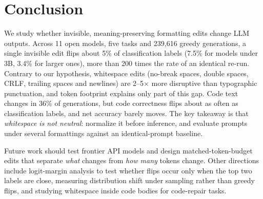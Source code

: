 \section{Conclusion}
\label{sec:conclusion}

We study whether invisible, meaning-preserving formatting edits change LLM outputs.
Across 11 open models, five tasks and 239,616 greedy generations, a single invisible edit flips about 5\% of classification labels (7.5\% for models under 3B, 3.4\% for larger ones), more than 200 times the rate of an identical re-run.
Contrary to our hypothesis, whitespace edits (no-break spaces, double spaces, CRLF, trailing spaces and newlines) are 2--5$\times$ more disruptive than typographic punctuation, and token footprint explains only part of this gap.
Code text changes in 36\% of generations, but code correctness flips about as often as classification labels, and net accuracy barely moves.
The key takeaway is that \emph{whitespace is not neutral}: normalize it before inference, and evaluate prompts under several formattings against an identical-prompt baseline.

Future work should test frontier API models and design matched-token-budget edits that separate \emph{what} changes from \emph{how many} tokens change.
Other directions include logit-margin analysis to test whether flips occur only when the top two labels are close, measuring distribution shift under sampling rather than greedy flips, and studying whitespace inside code bodies for code-repair tasks.
